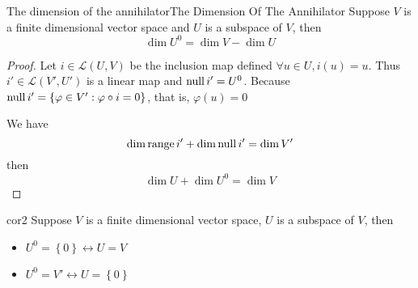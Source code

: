 \documentclass[../main.tex]{subfiles}
\begin{document}
\begin{theorem}{The dimension of the annihilator}{The Dimension Of The Annihilator}
Suppose $V$ is a finite dimensional vector space and $U$ is a subspace of $V$, then 
\begin{equation*}
\dim U^0 = \dim V-\dim U
\end{equation*}
\end{theorem}
\begin{proof}
Let  $i\in \mathscr{L}(U,V)$ be the inclusion map defined $\forall u\in U,i(u)=u$. Thus $i'\in \mathscr{L}(V',U')$ is a linear map and $\operatorname{null} i'=U^0$. Because $\operatorname{null} i' = \left\{ \varphi \in V' : \varphi \circ i = 0 \right\}$, that is, $\varphi(u)=0$

We have 
\begin{equation*}
\dim\operatorname{range} i' +\dim \operatorname{null} i' = \dim V'
\end{equation*}
then
\begin{equation*}
\dim U+\dim U^0 = \dim V
\end{equation*}
\end{proof}
\begin{corollary}{}{cor2}
Suppose $V$ is a finite dimensional vector space, $U$ is a subspace of $V$, then
\begin{itemize}
\item $U^0=\left\{ 0 \right\} \leftrightarrow U=V$ 
\item $U^0=V' \leftrightarrow U = \left\{ 0 \right\}$
\end{itemize}
\end{corollary}
\end{document}
